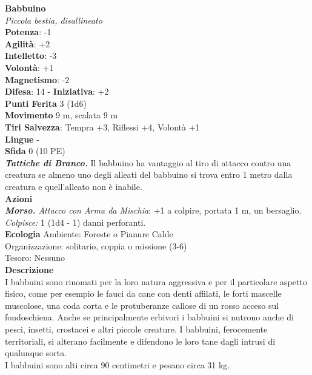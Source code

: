 \begin{multicols}{2}
\medskip\textbf{Babbuino}\\
\emph{Piccola bestia, disallineato}\\
\textbf{Potenza}: -1\\
\textbf{Agilità}: +2\\
\textbf{Intelletto}: -3\\
\textbf{Volontà}: +1\\
\textbf{Magnetismo}: -2\\
\textbf{Difesa}: 14 - \textbf{Iniziativa}: +2\\
\textbf{Punti Ferita} 3 (1d6)\\
\textbf{Movimento} 9 m, scalata 9 m\\
\textbf{Tiri Salvezza}: Tempra +3, Riflessi +4, Volontà +1\\
\textbf{Lingue} -\\
\textbf{Sfida} 0 (10 PE)\smallskip\\
\emph{\textbf{Tattiche di Branco.}} Il babbuino ha vantaggio al tiro di attacco contro una creatura se almeno uno degli alleati del babbuino si trova entro 1 metro dalla creatura e quell'alleato non è inabile.\\
\smallskip\textbf{Azioni}\\
\emph{\textbf{Morso.} Attacco con Arma da Mischia}: +1 a colpire, portata 1 m, un bersaglio.\\
\emph{Colpisce:} 1 (1d4 - 1) danni perforanti.\\
\textbf{Ecologia}
Ambiente: Foreste o Pianure Calde\\
Organizzazione: solitario, coppia o missione (3-6)\\
Tesoro: Nessuno\\
\textbf{Descrizione}\\
I babbuini sono rinomati per la loro natura aggressiva e per il particolare aspetto fisico, come per esempio le fauci da cane con denti affilati, le forti mascelle muscolose, una coda corta e le protuberanze callose di un rosso acceso sul fondoschiena. Anche se principalmente erbivori i babbuini si nutrono anche di pesci, insetti, crostacei e altri piccole creature. I babbuini, ferocemente territoriali, si alterano facilmente e difendono le loro tane dagli intrusi di qualunque sorta.\\

I babbuini sono alti circa 90 centimetri e pesano circa 31 kg.\\


\end{multicols}
